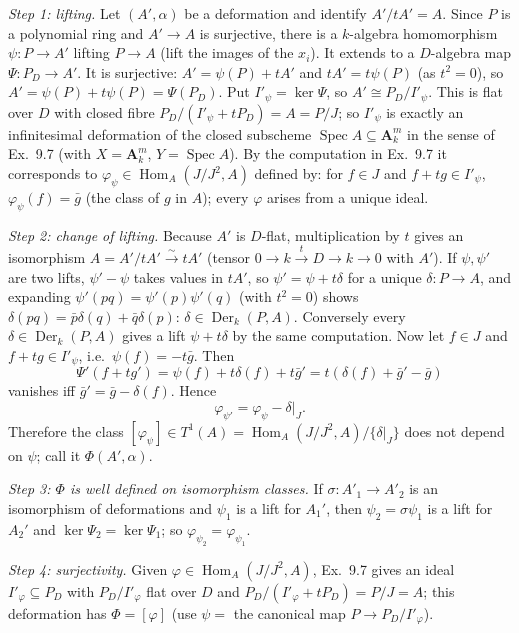\documentclass[11pt]{article}
\begin{document}
\emph{Step 1: lifting.} Let $(A',\alpha)$ be a deformation and identify $A'/tA'=A$. Since $P$ is a polynomial ring and $A'\to A$ is surjective, there is a $k$-algebra homomorphism $\psi:P\to A'$ lifting $P\to A$ (lift the images of the $x_i$). It extends to a $D$-algebra map $\Psi:P_D\to A'$. It is surjective: $A'=\psi(P)+tA'$ and $tA'=t\psi(P)$ (as $t^2=0$), so $A'=\psi(P)+t\psi(P)=\Psi(P_D)$. Put $I'_\psi=\ker\Psi$, so $A'\cong P_D/I'_\psi$. This is flat over $D$ with closed fibre $P_D/(I'_\psi+tP_D)=A=P/J$; so $I'_\psi$ is exactly an infinitesimal deformation of the closed subscheme $\operatorname{Spec}A\subseteq\mathbf A^m_k$ in the sense of Ex.~9.7 (with $X=\mathbf A^m_k$, $Y=\operatorname{Spec}A$). By the computation in Ex.~9.7 it corresponds to $\varphi_\psi\in\operatorname{Hom}_A(J/J^2,A)$ defined by: for $f\in J$ and $f+tg\in I'_\psi$, $\varphi_\psi(f)=\bar g$ (the class of $g$ in $A$); every $\varphi$ arises from a unique ideal.

\emph{Step 2: change of lifting.} Because $A'$ is $D$-flat, multiplication by $t$ gives an isomorphism $A=A'/tA'\xrightarrow{\sim}tA'$ (tensor $0\to k\xrightarrow{t}D\to k\to0$ with $A'$). If $\psi,\psi'$ are two lifts, $\psi'-\psi$ takes values in $tA'$, so $\psi'=\psi+t\delta$ for a unique $\delta:P\to A$, and expanding $\psi'(pq)=\psi'(p)\psi'(q)$ (with $t^2=0$) shows $\delta(pq)=\bar p\delta(q)+\bar q\delta(p)$: $\delta\in\operatorname{Der}_k(P,A)$. Conversely every $\delta\in\operatorname{Der}_k(P,A)$ gives a lift $\psi+t\delta$ by the same computation. Now let $f\in J$ and $f+tg\in I'_\psi$, i.e.\ $\psi(f)=-t\bar g$. Then
\[
\Psi'(f+tg')=\psi(f)+t\delta(f)+t\bar g'=t(\delta(f)+\bar g'-\bar g)
\]
vanishes iff $\bar g'=\bar g-\delta(f)$. Hence
\[
\varphi_{\psi'}=\varphi_\psi-\delta|_J .
\]
Therefore the class $[\varphi_\psi]\in T^1(A)=\operatorname{Hom}_A(J/J^2,A)/\{\delta|_J\}$ does not depend on $\psi$; call it $\Phi(A',\alpha)$.

\emph{Step 3: $\Phi$ is well defined on isomorphism classes.} If $\sigma:A'_1\to A'_2$ is an isomorphism of deformations and $\psi_1$ is a lift for $A_1'$, then $\psi_2=\sigma\psi_1$ is a lift for $A_2'$ and $\ker\Psi_2=\ker\Psi_1$; so $\varphi_{\psi_2}=\varphi_{\psi_1}$.

\emph{Step 4: surjectivity.} Given $\varphi\in\operatorname{Hom}_A(J/J^2,A)$, Ex.~9.7 gives an ideal $I'_\varphi\subseteq P_D$ with $P_D/I'_\varphi$ flat over $D$ and $P_D/(I'_\varphi+tP_D)=P/J=A$; this deformation has $\Phi=[\varphi]$ (use $\psi=$ the canonical map $P\to P_D/I'_\varphi$).
\end{document}
